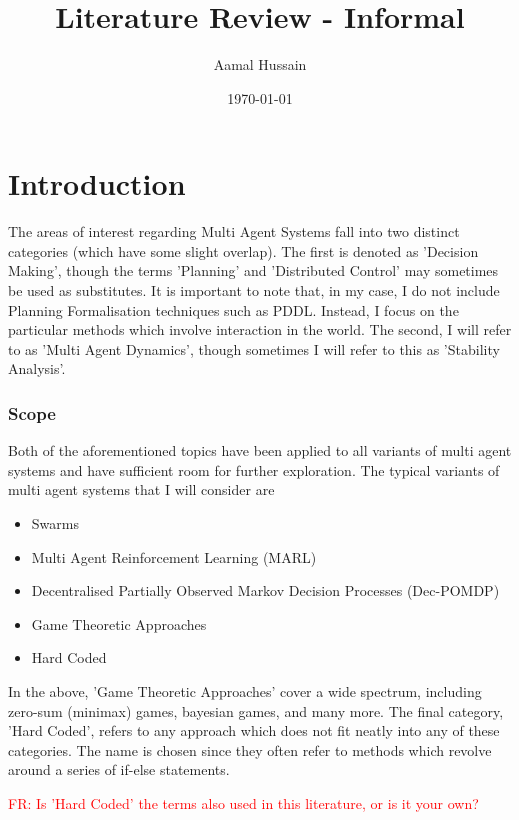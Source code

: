 \documentclass[preprint,11pt]{report}
\title{Literature Review - Informal}
\author{Aamal Hussain}
\date{\today}
\newcommand\fr[1]{\textcolor{red}{FR: #1}}
\begin{document}
\maketitle 

\tableofcontents

\chapter*{Introduction}



The areas of interest regarding Multi Agent Systems fall into two
distinct categories (which have some slight overlap). The first is
denoted as 'Decision Making', though the terms 'Planning' and
'Distributed Control' may sometimes be used as substitutes. It is
important to note that, in my case, I do not include Planning
Formalisation techniques such as PDDL. Instead, I focus on the
particular methods which involve interaction in the world. The second,
I will refer to as 'Multi Agent Dynamics', though sometimes I will
refer to this as 'Stability Analysis'.

\subsection*{Scope}

Both of the aforementioned topics have been applied to all variants of
multi agent systems and have sufficient room for further
exploration. The typical variants of multi agent systems that I will
consider are

\begin{itemize} \item Swarms \item Multi Agent Reinforcement Learning (MARL) \item Decentralised
Partially Observed Markov Decision Processes (Dec-POMDP) \item Game Theoretic Approaches \item Hard
Coded \end{itemize}

In the above, 'Game Theoretic Approaches' cover a wide spectrum,
including zero-sum (minimax) games, bayesian games, and many more. The
final category, 'Hard Coded', refers to any approach which does not
fit neatly into any of these categories. The name is chosen since they
often refer to methods which revolve around a series of if-else
statements.

\fr{Is 'Hard Coded' the terms also used in this literature, or is it your own?}
\end{document}
